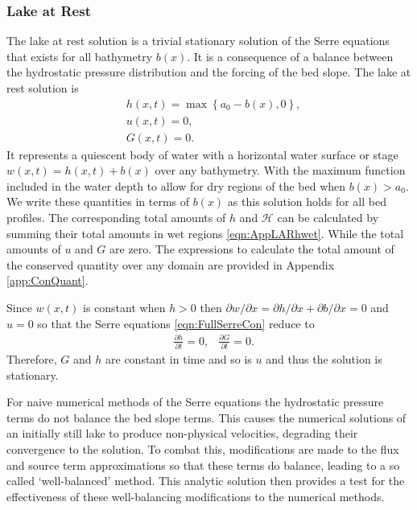 \subsubsection{Lake at Rest}
The lake at rest solution is a trivial stationary solution of the Serre equations that exists for all bathymetry $b(x)$. It is a consequence of a balance between the hydrostatic pressure distribution and the forcing of the bed slope. The lake at rest solution is
\begin{subequations}
	\begin{align}
	&h(x,t) = \max\left\lbrace a_0 - b(x), 0 \right\rbrace, \\
	&u(x,t) = 0 , \\
	&G(x,t) = 0 .
	\end{align}
	\label{eqn:LARdefhub}
\end{subequations}
It represents a quiescent body of water with a horizontal water surface or stage $w(x,t) = h(x,t) + b(x)$ over any bathymetry. With the maximum function included in the water depth to allow for dry regions of the bed when $b(x) > a_0$. We write these quantities in terms of $b(x)$ as this solution holds for all bed profiles. The corresponding total amounts of $h$ and $\mathcal{H}$ can be calculated by summing their total amounts in wet regions \eqref{eqn:AppLARhwet}. While the total amounts of $u$ and $G$ are zero. The expressions to calculate the total amount of the conserved quantity over any domain are provided in Appendix \ref{app:ConQuant}. 

Since $w(x,t)$ is constant when $h> 0$ then $\partial w / \partial x = \partial h / \partial x + \partial b / \partial x = 0 $ and $u=0$ so that the Serre equations \eqref{eqn:FullSerreCon} reduce to
\begin{align*}
& \frac{\partial h}{\partial t}  = 0,  &\frac{\partial G}{\partial t}  = 0.
\end{align*}
Therefore, $G$ and $h$ are constant in time and so is $u$ and thus the solution is stationary.

For naive numerical methods of the Serre equations the hydrostatic pressure terms do not balance the bed slope terms. This causes the numerical solutions of an initially still lake to produce non-physical velocities, degrading their convergence to the solution. To combat this, modifications are made to the flux and source term approximations so that these terms do balance, leading to a so called `well-balanced' method. This analytic solution then provides a test for the effectiveness of these well-balancing modifications to the numerical methods.


